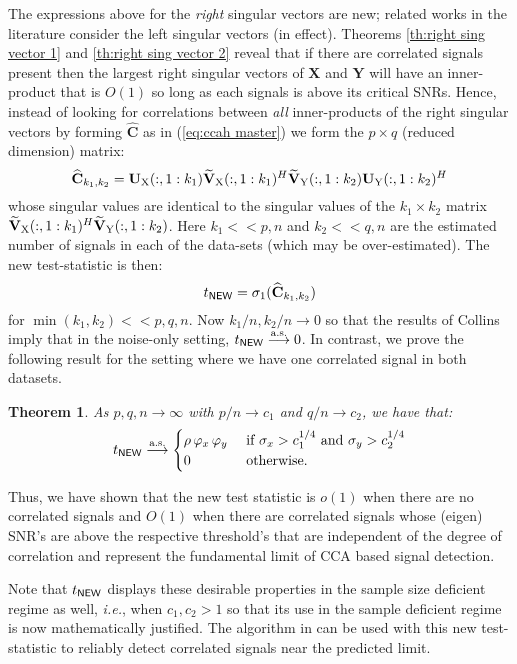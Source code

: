 \documentclass[conference]{IEEEtran}
\newcommand{\X}{\mathbf{X}}
\newcommand{\Y}{\mathbf{Y}}
\newcommand{\Ux}{{\mathbf{U}}_{{\rm X}}}
\newcommand{\Uy}{{\mathbf{U}}_{{\rm Y}}}
\newcommand{\Vxt}{\widetilde{{\mathbf{V}}}_{{\rm X}}}
\newcommand{\Vyt}{\widetilde{{\mathbf{V}}}_{{\rm Y}}}
\newcommand{\convas}{\overset{\textrm{a.s.}}{\longrightarrow}}
\newtheorem{Th}{Theorem}[section]
\newcommand{\CCh}{\widehat{\mathbf{C}}}
\begin{document}
The expressions above for the \textit{right} singular vectors are new; related works in the literature \cite{paul2007asymptotics,mestre2008asymptotic,nadler2008finite} consider the left singular vectors (in effect).      Theorems \ref{th:right sing vector 1} and \ref{th:right sing vector 2} reveal that if there are correlated signals present then the largest right singular vectors of $\X$ and $\Y$ will have an inner-product that is $O(1)$ so long as each signals is above its critical SNRs. Hence, instead of looking for correlations between \textit{all} inner-products of the right singular vectors by forming $\CCh$ as in (\ref{eq:ccah master}) we form the $p \times q$ (reduced dimension)  matrix:
$$\CCh_{k_1,k_2} =\Ux(:,1:k_1) \Vxt(:,1:k_1)^{H} \Vyt(:,1:k_2) \Uy(:,1:k_2)^{H}$$
whose singular values are identical to the singular values of the $k_1 \times k_2$ matrix $\Vxt(:,1:k_1)^{H} \Vyt(:,1:k_2)$. Here $k_1 << p,n$ and $k_2 << q,n$ are the estimated number of signals in each of the data-sets (which may be over-estimated). The new test-statistic is then:
\begin{equation} \label{eq:tnew}
t_{{\sf NEW}} =   \sigma_{1} (\CCh_{k_1,k_2})
\end{equation}
for $\min(k_1,k_2) << p,q,n$. Now $k_1/n, k_2/n \to 0$ so that the results of Collins imply that in the noise-only setting, $t_{{\sf NEW}} \convas 0$. In contrast, we prove the following result for the setting where we have one correlated signal in both datasets.

\flushleft \begin{Th}\label{th:fun limit}
As $p,q,n \longrightarrow \infty$ with $p/n \to c_1$ and $q/n \to c_2$, we have that:
$$
t_{{\sf NEW}} \convas
\begin{cases}
\rho \,\varphi_{x} \, \varphi_{y} &\textrm{ if } \sigma_{x} > c_{1}^{1/4} \textrm{ and } \sigma_{y} > c_{2}^{1/4}\\
0 &\textrm{ otherwise.}\end{cases}$$
\end{Th}
Thus, we have shown that the new test statistic is $o(1)$ when there are no correlated signals and $O(1)$ when there are correlated signals whose (eigen) SNR's are above the respective threshold's that are independent of the degree of correlation and represent the fundamental limit of CCA based signal detection.

Note  that $t_{{\sf NEW}}$ displays these desirable properties in the sample size deficient regime as well, \textit{i.e.}, when $c_1, c_2 > 1$ so that its use in the sample deficient regime is now mathematically justified. The algorithm  in \cite{gunderson1997estimating} can be used with this new test-statistic to reliably detect correlated signals near the predicted limit.
\end{document}
